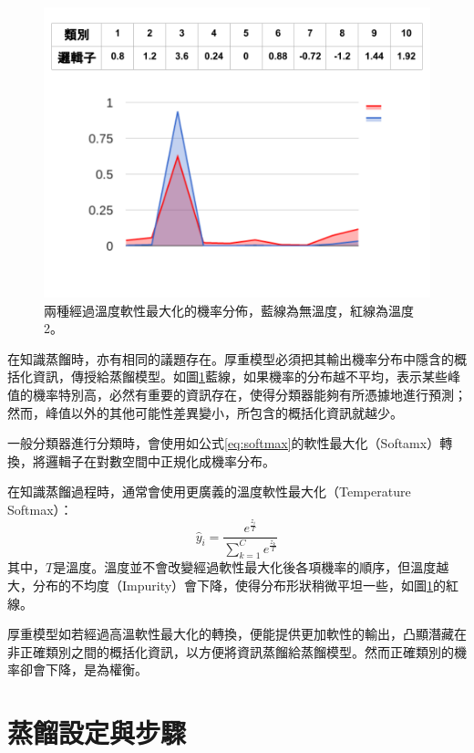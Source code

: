 \begin{figure}[!h]
\centering
\includegraphics[scale=0.30]{images/chap5_impurity.png}
\caption{兩種經過溫度軟性最大化的機率分佈，藍線為無溫度，紅線為溫度2。}
\label{fig:chap5_impurity}
\end{figure}
在知識蒸餾時，亦有相同的議題存在。厚重模型必須把其輸出機率分布中隱含的概括化資訊，傳授給蒸餾模型。如圖\ref{fig:chap5_impurity}藍線，如果機率的分布越不平均，表示某些峰值的機率特別高，必然有重要的資訊存在，使得分類器能夠有所憑據地進行預測；然而，峰值以外的其他可能性差異變小，所包含的概括化資訊就越少。

一般分類器進行分類時，會使用如公式\ref{eq:softmax}的軟性最大化（Softamx）轉換，將邏輯子在對數空間中正規化成機率分布。

在知識蒸餾過程時，通常會使用更廣義的溫度軟性最大化（Temperature Softmax）：
\begin{equation}
\hat{y}_i = \frac{e^{\frac{z_i}{T} }}{\sum_{k=1}^{C}e^{\frac{z_k}{T}} }
\end{equation}
其中，$T$是溫度。溫度並不會改變經過軟性最大化後各項機率的順序，但溫度越大，分布的不均度（Impurity）會下降，使得分布形狀稍微平坦一些，如圖\ref{fig:chap5_impurity}的紅線。

厚重模型如若經過高溫軟性最大化的轉換，便能提供更加軟性的輸出，凸顯潛藏在非正確類別之間的概括化資訊，以方便將資訊蒸餾給蒸餾模型。然而正確類別的機率卻會下降，是為權衡。

\section{蒸餾設定與步驟}

